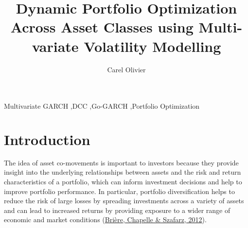 \documentclass[11pt,preprint, authoryear]{elsarticle}
\numberwithin{equation}{section}
\numberwithin{figure}{section}
\numberwithin{table}{section}
\begin{document}
\begin{frontmatter}  %

\title{Dynamic Portfolio Optimization Across Asset Classes using
Multi-variate Volatility Modelling}





\author[Add1]{Carel Olivier}





\address[Add1]{22017542}



\vspace{1cm}


\begin{keyword}
\footnotesize{
Multivariate GARCH \sep DCC \sep Go-GARCH \sep Portfolio Optimization \\
\vspace{0.3cm}
}
\end{keyword}



\vspace{0.5cm}

\end{frontmatter}



\pagestyle{fancy}
\chead{}
\rhead{}
\lfoot{}
\lhead{}
\cfoot{}


\headsep 35pt %




\hypertarget{introduction}{%
\section{\texorpdfstring{Introduction
\label{Introduction}}{Introduction }}\label{introduction}}

The idea of asset co-movements is important to investors because they
provide insight into the underlying relationships between assets and the
risk and return characteristics of a portfolio, which can inform
investment decisions and help to improve portfolio performance. In
particular, portfolio diversification helps to reduce the risk of large
losses by spreading investments across a variety of assets and can lead
to increased returns by providing exposure to a wider range of economic
and market conditions (\protect\hyperlink{ref-briere2012no}{Brière,
Chapelle \& Szafarz, 2012}).
\end{document}
